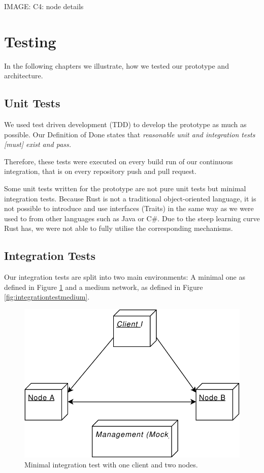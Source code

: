 IMAGE: C4: node details

\section{Testing}
\label{testing}

In the following chapters we illustrate, how we tested our prototype and architecture.

\subsection{Unit Tests}\label{unit-tests}
We used test driven development (TDD) to develop the prototype as much as possible. Our Definition of Done\cite{project-plan} states that \emph{reasonable unit and integration tests [must] exist and pass.}

Therefore, these tests were executed on every build run of our continuous integration, that is on every repository push and pull request.

Some unit tests written for the prototype are not pure unit tests but minimal integration tests. Because Rust is not a traditional object-oriented language, it is not possible to introduce and use interfaces (Traits) in the same way as we were used to from other languages such as Java or C#. Due to the steep learning curve Rust has, we were not able to fully utilise the corresponding mechanisms. 

\subsection{Integration Tests}\label{integration-tests}

Our integration tests are split into two main environments: A minimal one as defined in Figure \ref{fig:integrationtestsmall} and a medium network, as defined in Figure \ref{fig:integrationtestmedium}.

\begin{figure}
	\centering
	\includegraphics[width=0.5\linewidth]{resources/integration_test_small}
	\caption[Minimal integration test]{Minimal integration test with one client and two nodes.}
	\label{fig:integrationtestsmall}
\end{figure}

